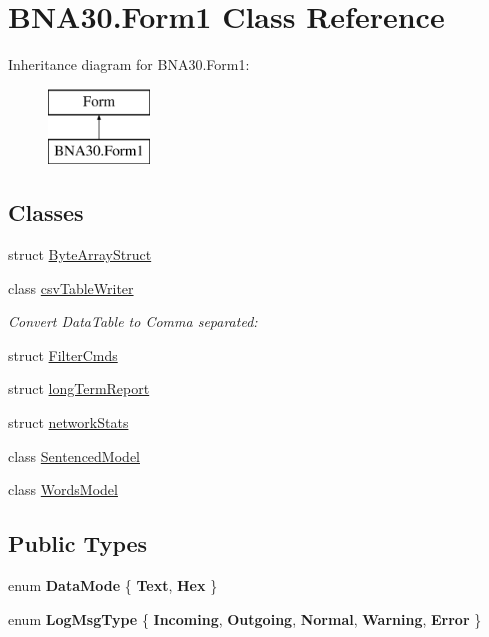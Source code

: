 \hypertarget{class_b_n_a30_1_1_form1}{}\section{B\+N\+A30.\+Form1 Class Reference}
\label{class_b_n_a30_1_1_form1}
Inheritance diagram for B\+N\+A30.\+Form1\+:\begin{figure}[H]
\begin{center}
\leavevmode
\includegraphics[height=2.000000cm]{class_b_n_a30_1_1_form1}
\end{center}
\end{figure}
\subsection*{Classes}
\begin{DoxyCompactItemize}
\item 
struct \mbox{\hyperlink{struct_b_n_a30_1_1_form1_1_1_byte_array_struct}{Byte\+Array\+Struct}}
\item 
class \mbox{\hyperlink{class_b_n_a30_1_1_form1_1_1csv_table_writer}{csv\+Table\+Writer}}
\begin{DoxyCompactList}\small\item\em Convert Data\+Table to Comma separated\+: \end{DoxyCompactList}\item 
struct \mbox{\hyperlink{struct_b_n_a30_1_1_form1_1_1_filter_cmds}{Filter\+Cmds}}
\item 
struct \mbox{\hyperlink{struct_b_n_a30_1_1_form1_1_1long_term_report}{long\+Term\+Report}}
\item 
struct \mbox{\hyperlink{struct_b_n_a30_1_1_form1_1_1network_stats}{network\+Stats}}
\item 
class \mbox{\hyperlink{class_b_n_a30_1_1_form1_1_1_sentenced_model}{Sentenced\+Model}}
\item 
class \mbox{\hyperlink{class_b_n_a30_1_1_form1_1_1_words_model}{Words\+Model}}
\end{DoxyCompactItemize}
\subsection*{Public Types}
\begin{DoxyCompactItemize}
\item 
\mbox{\label{class_b_n_a30_1_1_form1_a4a2e9f6579b222809e7149d78736e8b5}} 
enum {\bfseries Data\+Mode} \{ {\bfseries Text}, 
{\bfseries Hex}
 \}
\item 
\mbox{\label{class_b_n_a30_1_1_form1_a849ad8ebddd7f8f78f29c9f966218019}} 
enum {\bfseries Log\+Msg\+Type} \{ \newline
{\bfseries Incoming}, 
{\bfseries Outgoing}, 
{\bfseries Normal}, 
{\bfseries Warning}, 
\newline
{\bfseries Error}
 \}
\end{DoxyCompactItemize}
